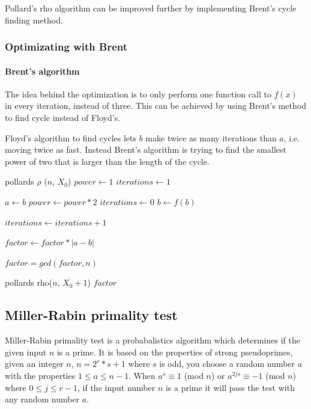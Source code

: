 Pollard's rho algorithm can be improved further by implementing Brent's cycle finding method. \cite{brent}

\subsubsection{Optimizating with Brent}

\paragraph{Brent's algorithm}
The idea behind the optimization is to only perform one function call to $f(x)$ in every iteration, instead of three. 
This can be achieved by using Brent's method to find cycle instead of Floyd's.

Floyd's algorithm to find cycles lets $b$ make twice as many iterations than $a$, i.e. moving twice as fast. Instead
Brent's algorithm is trying to find the smallest power of two that is larger than the length of the cycle.

\begin{algorithmic}
    \STATE pollards $\rho$ ($n$, $X_0$)
        \STATE $power \gets 1$
        \STATE $iterations \gets 1$

                    \STATE $a \gets b$
                    \STATE $power \gets power *2$
                    \STATE $iterations \gets 0$
                \ENDIF 
                \STATE $b \gets f(b)$

                \STATE $iterations \gets iterations + 1$

                \STATE $factor \gets factor * |a-b|$
            
            \ENDFOR


            \STATE $factor = gcd(factor, n)$
        \ENDWHILE

            \STATE {}
            \RETURN pollards rho($n$, $X_0+1$) 
            \RETURN $factor$
        \ENDIF
\end{algorithmic}



\subsection{Miller-Rabin primality test}
Miller-Rabin primality test is a probabalistics algorithm which determines if the given input $n$ is a prime. It is based on the properties of strong pseudoprimes, given an integer $n$, $n = 2^r * s + 1$ where $s$ is odd, you choose a random number $a$ with the properties $1 \leq a \leq n - 1$. When $a^s \equiv 1$ (mod $n$) or $a^{2js} \equiv - 1$ (mod $n$) where $0 \leq j \leq r - 1$, if the input number $n$ is a prime it will pass the test with any random number $a$.


